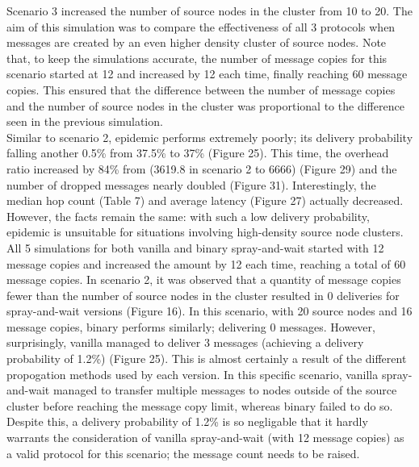 \documentclass{article}
\begin{document}
\noindent Scenario 3 increased the number of source nodes in the cluster from 10 to 20. The aim of this simulation was to compare the effectiveness of all 3 protocols when messages are created by an even higher density cluster of source nodes. Note that, to keep the simulations accurate, the number of message copies for this scenario started at 12 and increased by 12 each time, finally reaching 60 message copies. This ensured that the difference between the number of message copies and the number of source nodes in the cluster was proportional to the difference seen in the previous simulation.\\
\newline Similar to scenario 2, epidemic performs extremely poorly; its delivery probability falling another 0.5\% from 37.5\% to 37\% (Figure 25). This time, the overhead ratio increased by 84\% from (3619.8 in scenario 2 to 6666) (Figure 29) and the number of dropped messages nearly doubled (Figure 31). Interestingly, the median hop count (Table 7) and average latency (Figure 27) actually decreased. However, the facts remain the same: with such a low delivery probability, epidemic is unsuitable for situations involving high-density source node clusters.\\
\newline All 5 simulations for both vanilla and binary spray-and-wait started with 12 message copies and increased the amount by 12 each time, reaching a total of 60 message copies. In scenario 2, it was observed that a quantity of message copies fewer than the number of source nodes in the cluster resulted in 0 deliveries for spray-and-wait versions (Figure 16). In this scenario, with 20 source nodes and 16 message copies, binary performs similarly; delivering 0 messages. However, surprisingly, vanilla managed to deliver 3 messages (achieving a delivery probability of 1.2\%) (Figure 25). This is almost certainly a result of the different propogation methods used by each version. In this specific scenario, vanilla spray-and-wait managed to transfer multiple messages to nodes outside of the source cluster before reaching the message copy limit, whereas binary failed to do so. Despite this, a delivery probability of 1.2\% is so negligable that it hardly warrants the consideration of vanilla spray-and-wait (with 12 message copies) as a valid protocol for this scenario; the message count needs to be raised.\\
\end{document}
